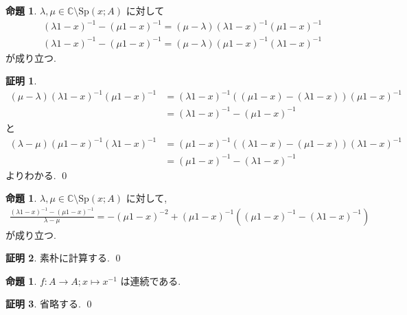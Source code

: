\documentclass[10pt, fleqn, label-section=none]{bxjsarticle}
\theoremstyle{definition}
\newtheorem{prop}[dfn]{命題}
\newtheorem*{pf*}{証明}
\renewcommand{\;}{\, ; \,}
\begin{document}
\begin{prop}$\lambda, \mu \in \mathbb C \setminus \textrm{Sp}(x ; A) $ に対して
\begin{align*}   & (\lambda1 - x)^{-1}  -  (\mu 1 - x)^{-1} = (\mu - \lambda)  (\lambda1 - x)^{-1}  (\mu 1 - x)^{-1}  \\ &(\lambda1 - x)^{-1}  -  (\mu 1 - x)^{-1} = (\mu - \lambda)  (\mu 1 - x)^{-1}  (\lambda 1 - x)^{-1}      \end{align*}
が成り立つ. 
\end{prop}
\begin{pf*}
\begin{align*}  (\mu - \lambda)  (\lambda1 - x)^{-1}  (\mu 1 - x)^{-1}   &=   (\lambda1 - x)^{-1} ( (\mu 1 - x) - (\lambda 1 - x) )  (\mu 1 - x)^{-1}  \\&=    (\lambda1 - x)^{-1}  -  (\mu 1 - x)^{-1}            \end{align*}
と
\begin{align*}  (\lambda - \mu)  (\mu1 - x)^{-1}  (\lambda 1 - x)^{-1}  &= (\mu 1 - x) ^{-1} ( (\lambda 1 - x) - (\mu 1 - x) ) (\lambda 1 - x) ^{-1}  \\&= (\mu 1 - x) ^{-1} - (\lambda 1 - x) ^{-1}  \end{align*}
よりわかる. 
\qed
\end{pf*}

\begin{prop}$\lambda, \mu \in  \mathbb C \setminus \textrm{Sp}(x ; A) $ に対して, 
\begin{align*} \frac{ (\lambda 1 - x)^{-1} - (\mu1 - x)^{-1}   }{\lambda - \mu} = - (\mu1 - x)^{-2} + (\mu1 - x)^{-1}  ((\mu1 - x)^{-1}  - (\lambda 1 - x)^{-1} )    \end{align*}
が成り立つ.
\end{prop}
\begin{pf*}
素朴に計算する. 
\qed
\end{pf*}

\begin{prop}$f: A \rightarrow A; x \mapsto x^{-1}$ は連続である. 
\end{prop}
\begin{pf*}
省略する.
\qed
\end{pf*}
\end{document}
